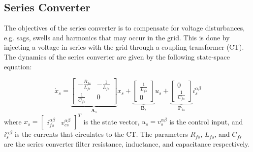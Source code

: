 \subsection{Series Converter}

The objectives of the series converter is to compensate for voltage disturbances, e.g. sags, swells and harmonics that may occur in the grid. This is done by injecting a voltage in series with the grid through a coupling transformer (CT). The dynamics of the series converter are given by the following state-space equation:

\begin{equation}
    \dot{x}_s =
    \underbrace{
    \begin{bmatrix}
        -\frac{R_{fs}}{L_{fs}} & -\frac{1}{L_{fs}} \\
        \frac{1}{C_{fs}} & 0
    \end{bmatrix}
    }_{\mathbf{A}_s}
    x_s +
    \underbrace{
    \begin{bmatrix}
        \frac{1}{L_{fs}}\\
        0
    \end{bmatrix}
    }_{\mathbf{B}_s}
    u_s +
    \underbrace{
    \begin{bmatrix}
        0 \\
        \frac{1}{C_{fs}}
    \end{bmatrix}
    }_{\mathbf{P}_{is}}
    i_s^{\alpha\beta} \label{eq:SeriesConverter_Dynamics}
\end{equation}
where $x_s = \begin{bmatrix} i_{fs}^{\alpha\beta} & v_{cs}^{\alpha\beta} \end{bmatrix}^T$ is the state vector, $u_s = v_s^{\alpha\beta}$ is the control input, and $i_s^{\alpha\beta}$ is the currents that circulates to the CT. The parameters $R_{fs}$, $L_{fs}$, and $C_{fs}$ are the series converter filter resistance, inductance, and capacitance respectively.

